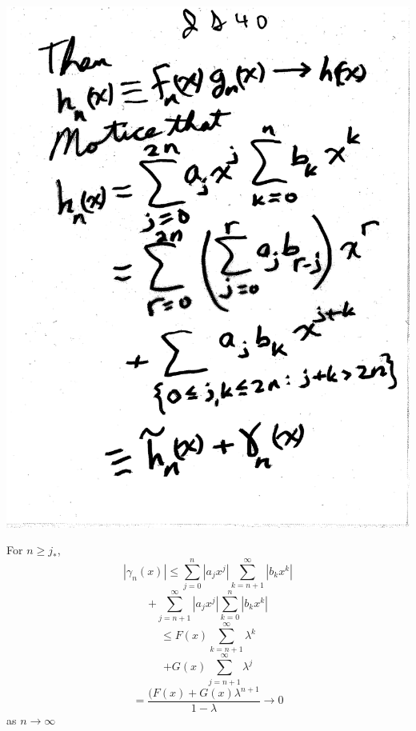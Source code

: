 \documentclass[10pt,a4paper]{article}
\begin{document}
\includegraphics[scale=.5]{Pages/IS_40}

\newpage 

For $n \geq j_*$,
$$|\gamma_n (x)| \leq \sum_{j=0}^n |a_jx^j| \sum_{k=n+1}^\infty |b_kx^k|$$ 
$$+  \sum_{j=n+1}^\infty |a_jx^j| \sum_{k=0}^n |b_kx^k|$$ $$\leq F(x) \sum_{k=n+1}^\infty \lambda^k$$ $$+ G(x)
\sum_{j=n+1}^\infty \lambda^j$$ $$= \frac{(F(x)+G(x)\lambda^{n+1}}{1-\lambda} \rightarrow 0 $$ as $n \rightarrow \infty$
\end{document}
